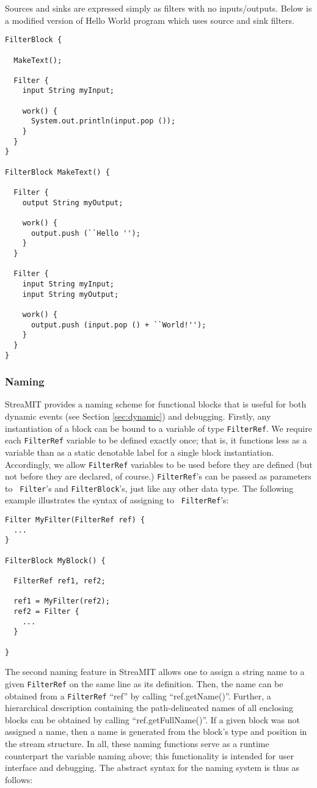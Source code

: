\documentclass[draft]{article}
\begin{document}
Sources and sinks are expressed simply as filters with no inputs/outputs.
Below is a modified version of Hello World program which uses source
and sink filters.

\begin{verbatim}
FilterBlock {

  MakeText();

  Filter {
    input String myInput;
    
    work() {
      System.out.println(input.pop ());
    }
  }
}

FilterBlock MakeText() {

  Filter {
    output String myOutput;

    work() {
      output.push (``Hello '');
    }
  }

  Filter {
    input String myInput;
    input String myOutput;

    work() {
      output.push (input.pop () + ``World!'');
    }
  }
}

\end{verbatim}

\subsubsection{Naming}

StreaMIT provides a naming scheme for functional blocks that is useful
for both dynamic events (see Section {\ref{sec:dynamic}}) and
debugging.  Firstly, any instantiation of a block can be bound to a
variable of type {\tt FilterRef}.  We require each {\tt FilterRef}
variable to be defined exactly once; that is, it functions less as a
variable than as a static denotable label for a single block
instantiation.  Accordingly, we allow {\tt FilterRef} variables to be
used before they are defined (but not before they are declared, of
course.)  {\tt FilterRef}'s can be passed as parameters to {\tt
Filter}'s and {\tt FilterBlock}'s, just like any other data type.  The
following example illustrates the syntax of assigning to {\tt
FilterRef}'s:

\begin{verbatim}
Filter MyFilter(FilterRef ref) {
  ...
}

FilterBlock MyBlock() {

  FilterRef ref1, ref2;

  ref1 = MyFilter(ref2);
  ref2 = Filter {
    ...
  }

}
\end{verbatim}

The second naming feature in StreaMIT allows one to assign a string
name to a given {\tt FilterRef} on the same line as its definition.
Then, the name can be obtained from a {\tt FilterRef} ``ref'' by
calling ``ref.getName()''.  Further, a hierarchical description
containing the path-delineated names of all enclosing blocks can be
obtained by calling ``ref.getFullName()''.  If a given block was not
assigned a name, then a name is generated from the block's type and
position in the stream structure.  In all, these naming functions
serve as a runtime counterpart the variable naming above; this
functionality is intended for user interface and debugging.  The
abstract syntax for the naming system is thus as follows:
\end{document}

